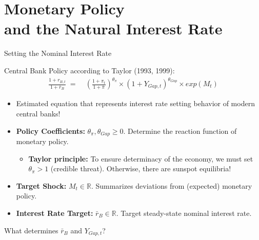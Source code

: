 \documentclass[10pt,c,aspectratio=1610,handout]{beamer}
\begin{document}
\section{Monetary Policy\\and the Natural Interest Rate}%
\begin{frame}{Setting the Nominal Interest Rate}%
  \begin{block}{Central Bank Policy according to Taylor (1993, 1999):}%
    \begin{align}%
      \frac{1+r_{B,t}}{1+\bar{r}_{B}} \; = & \; \left(\frac{1+\pi_t}{1+\bar{\pi}}\right)^{\theta_\pi} \times \left( 1+Y_{Gap,t} \right)^{\theta_{Gap}} \times exp(M_t)%
    \end{align}%
    \vspace*{-0.2in}%
    \begin{itemize}%
      \item[$\rightarrow$] Estimated equation that represents interest rate setting behavior of modern central banks!%
    \end{itemize}%
  \end{block}%
  \pause%
  \begin{itemize}%
    \item[$\blacktriangleright$] \textbf{Policy Coefficients:} $\theta_\pi,\theta_{Gap} \geq 0$. Determine the reaction function of monetary policy.%
    \begin{itemize}%
      \item[$\rightarrow$] \textbf{Taylor principle:} To ensure determinacy of the economy, we must set $\theta_\pi>1$ (credible threat). Otherwise, there are sunspot equilibria!%
    \end{itemize}%
    \pause%
    \item[$\blacktriangleright$] \textbf{Target Shock:} $M_t \in \mathbb{R}$. Summarizes deviations from (expected) monetary policy.%
    \pause%
    \item[$\blacktriangleright$] \textbf{Interest Rate Target:} $\bar{r}_B \in \mathbb{R}$. Target steady-state nominal interest rate.\\%
  \end{itemize}%
  \vspace*{0.1in}%
  \begin{center}%
    \begin{large}%
      What determines $\bar{r}_B$ and $Y_{Gap,t}$?%
    \end{large}%
  \end{center}%
\end{frame}%
\end{document}

